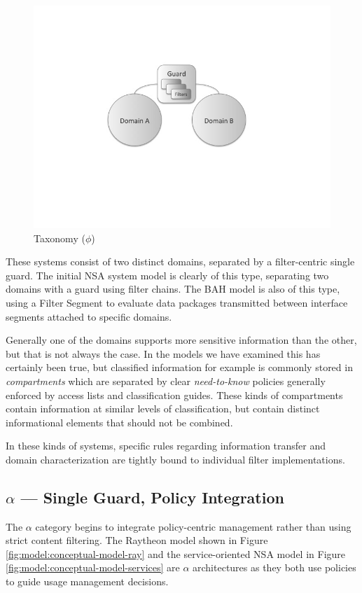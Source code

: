 \documentclass[12pt,letterpaper]{article}
\begin{document}
\begin{figure}[!t]
\centering
\includegraphics[width=5in]{model-phi}
\caption{Taxonomy ($\phi$)}
\label{fig:model:taxonomy-phi}
\end{figure}

These systems consist of two distinct domains, separated by a filter-centric single guard.  The initial NSA system model is clearly of this type, separating two domains with a guard using filter chains.  The BAH model is also of this type, using a Filter Segment to evaluate data packages transmitted between interface segments attached to specific domains.

Generally one of the domains supports more sensitive information than the other, but that is not always the case.  In the models we have examined this has certainly been true, but classified information for example  is commonly stored in \textit{compartments} which are separated by clear \textit{need-to-know} policies generally enforced by access lists and classification guides.  These kinds of compartments contain information at similar levels of classification, but contain distinct informational elements that should not be combined.

In these kinds of systems, specific rules regarding information transfer and domain characterization are tightly bound to individual filter implementations.

\subsection{$\alpha$ --- Single Guard, Policy Integration}
The $\alpha$ category begins to integrate policy-centric management rather than using strict content filtering.  The Raytheon model shown in Figure \ref{fig:model:conceptual-model-ray} and the service-oriented NSA model in Figure \ref{fig:model:conceptual-model-services} are $\alpha$ architectures as they both use policies to guide usage management decisions.
\end{document}
